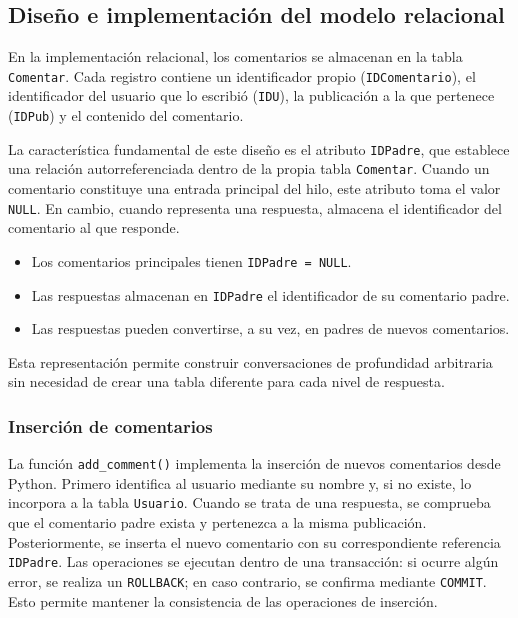 \documentclass[11pt, a4paper]{article}
\begin{document}
\subsection{Diseño e implementación del modelo relacional}
En la implementación relacional, los comentarios se almacenan en la tabla \texttt{Comentar}. Cada registro contiene un identificador propio (\texttt{IDComentario}), el identificador del usuario que lo escribió (\texttt{IDU}), la publicación a la que pertenece (\texttt{IDPub}) y el contenido del comentario.

La característica fundamental de este diseño es el atributo \texttt{IDPadre}, que establece una relación autorreferenciada dentro de la propia tabla \texttt{Comentar}. Cuando un comentario constituye una entrada principal del hilo, este atributo toma el valor \texttt{NULL}. En cambio, cuando representa una respuesta, almacena el identificador del comentario al que responde.

\begin{itemize}[leftmargin=1.5em]
    \item Los comentarios principales tienen \texttt{IDPadre = NULL}.
    \item Las respuestas almacenan en \texttt{IDPadre} el identificador de su comentario padre.
    \item Las respuestas pueden convertirse, a su vez, en padres de nuevos comentarios.
\end{itemize}

Esta representación permite construir conversaciones de profundidad arbitraria sin necesidad de crear una tabla diferente para cada nivel de respuesta.

\subsubsection{Inserción de comentarios}
La función \texttt{add\_comment()} implementa la inserción de nuevos comentarios desde Python. Primero identifica al usuario mediante su nombre y, si no existe, lo incorpora a la tabla \texttt{Usuario}. Cuando se trata de una respuesta, se comprueba que el comentario padre exista y pertenezca a la misma publicación. Posteriormente, se inserta el nuevo comentario con su correspondiente referencia \texttt{IDPadre}. Las operaciones se ejecutan dentro de una transacción: si ocurre algún error, se realiza un \texttt{ROLLBACK}; en caso contrario, se confirma mediante \texttt{COMMIT}. Esto permite mantener la consistencia de las operaciones de inserción.
\end{document}

